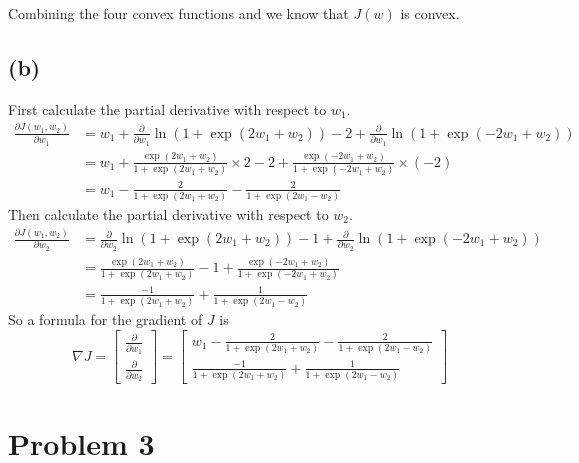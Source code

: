 \documentclass[11pt]{article}
\begin{document}
Combining the four convex functions and we know that $J(w)$ is convex.

\subsection*{(b)}
First calculate the partial derivative with respect to $w_1$.
\begin{equation}
    \begin{split}
        \frac{\partial J(w_1, w_2)}{\partial w_1} &= w_1 + \frac{\partial}{\partial w_1} \ln(1+\exp(2w_1+w_2)) - 2 + \frac{\partial}{\partial w_1} \ln(1+\exp(-2w_1+w_2))  \\
        &= w_1 + \frac{\exp(2w_1+w_2)}{1+\exp(2w_1+w_2)} \times 2 - 2 + \frac{\exp(-2w_1+w_2)}{1+\exp(-2w_1+w_2)} \times (-2) \\
       &= w_1 - \frac{2}{1+\exp(2w_1+w_2)} - \frac{2}{1+\exp(2w_1-w_2)}
    \end{split}
\end{equation}
Then calculate the partial derivative with respect to $w_2$.
\begin{equation}
    \begin{split}
        \frac{\partial J(w_1, w_2)}{\partial w_2} &=  \frac{\partial}{\partial w_2} \ln(1+\exp(2w_1+w_2)) - 1 + \frac{\partial}{\partial w_2} \ln(1+\exp(-2w_1+w_2))  \\
        &= \frac{\exp(2w_1+w_2)}{1+\exp(2w_1+w_2)} - 1 + \frac{\exp(-2w_1+w_2)}{1+\exp(-2w_1+w_2)} \\
       &= \frac{-1}{1+\exp(2w_1+w_2)} + \frac{1}{1+\exp(2w_1-w_2)}
    \end{split}
\end{equation}
So a formula for the gradient of $J$ is
\begin{equation}
    \nabla J =
    \begin{bmatrix}
        \frac{\partial}{\partial w_1} \\
        \frac{\partial}{\partial w_2}
    \end{bmatrix} =
    \begin{bmatrix}
        w_1 - \frac{2}{1+\exp(2w_1+w_2)} - \frac{2}{1+\exp(2w_1-w_2)} \\
        \frac{-1}{1+\exp(2w_1+w_2)} + \frac{1}{1+\exp(2w_1-w_2)}
    \end{bmatrix}
\end{equation}

\newpage
\section*{Problem 3}
\end{document}
